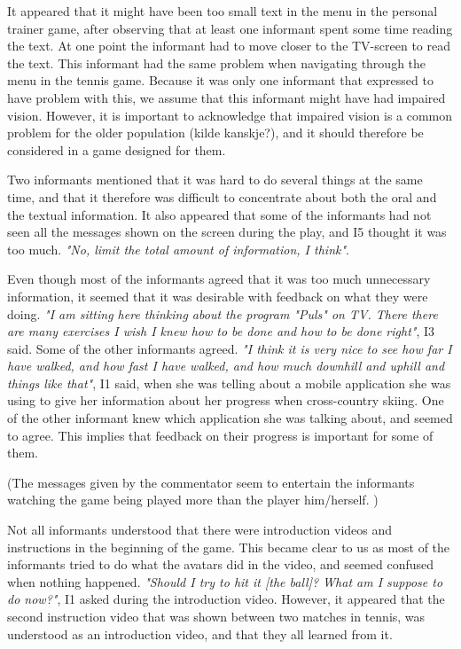 It appeared that it might have been too small text in the menu in the personal trainer game, after observing that at least one informant spent some time reading the text. At one point the informant had to move closer to the TV-screen to read the text. This informant had the same problem when navigating through the menu in the tennis game. Because it was only one informant that expressed to have problem with this, we assume that this informant might have had impaired vision. However, it is important to acknowledge that impaired vision is a common problem for the older population (kilde kanskje?), and it should therefore be considered in a game designed for them. 

Two informants mentioned that it was hard to do several things at the same time, and that it therefore was difficult to concentrate about both the oral and the textual information. It also appeared that some of the informants had not seen all the messages shown on the screen during the play, and I5 thought it was too much. \emph{"No, limit the total amount of information, I think"}. 

Even though most of the informants agreed that it was too much unnecessary information, it seemed that it was desirable with feedback on what they were doing. \emph{"I am sitting here thinking about the program "Puls" on TV. There there are many exercises I wish I knew how to be done and how to be done right"}, I3 said. Some of the other informants agreed. \emph{"I think it is very nice to see how far I have walked, and how fast I have walked, and how much downhill and uphill and things like that"}, I1 said, when she was telling about a mobile application she was using to give her information about her progress when cross-country skiing. One of the other informant knew which application she was talking about, and seemed to agree. This implies that feedback on their progress is important for some of them.  

(The messages given by the commentator seem to entertain the informants watching the game being played more than the player him/herself. )

Not all informants understood that there were introduction videos and instructions in the beginning of the game. This became clear to us as most of the informants tried to do what the avatars did in the video, and seemed confused when nothing happened. \emph{"Should I try to hit it [the ball]? What am I suppose to do now?"}, I1 asked during the introduction video. However, it appeared that the second instruction video that was shown between two matches in tennis, was understood as an introduction video, and that they all learned from it.  

